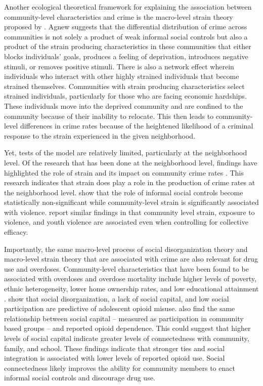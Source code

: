Another ecological theoretical framework for explaining the association between community-level characteristics and crime is the macro-level strain theory proposed by \citeauthor{agnew_general_1999} \citeyear{agnew_general_1999}. Agnew suggests that the differential distribution of crime across communities is not solely a product of weak informal social controls but also a product of the strain producing characteristics in these communities that either blocks individuals’ goals, produces a feeling of deprivation, introduces negative stimuli, or removes positive stimuli. There is also a network effect wherein individuals who interact with other highly strained individuals that become strained themselves. Communities with strain producing characteristics select strained individuals, particularly for those who are facing economic hardships. These individuals move into the deprived community and are confined to the community because of their inability to relocate. This then leads to community-level differences in crime rates because of the heightened likelihood of a criminal response to the strain experienced in the given neighborhood.

Yet, tests of the \textcite{agnew_general_1999} model are relatively limited, particularly at the neighborhood level. Of the research that has been done at the neighborhood level, findings have highlighted the role of strain and its impact on community crime rates \parencite{antunes_social_2022, warner_strain_2003}. This research indicates that strain does play a role in the production of crime rates at the neighborhood level. \textcite{warner_strain_2003} show that the role of informal social controls become statistically non-significant while community-level strain is significantly associated with violence. \textcite{antunes_social_2022} report similar findings in that community level strain, exposure to violence, and youth violence are associated even when controlling for collective efficacy. 

Importantly, the same macro-level process of social disorganization theory and macro-level strain theory that are associated with crime are also relevant for drug use and overdoses. Community-level characteristics that have been found to be associated with overdoses and overdose mortality include higher levels of poverty, ethnic heterogeneity, lower home ownership rates, and low educational attainment \parencite{chichester_pharmacies_2020, galea_income_2003, hannon_neighborhood_2006, ford_neighborhood_2017}. \textcite{ford_neighborhood_2017} show that social disorganization, a lack of social capital, and low social participation are predictive of adolescent opioid misuse. \textcite{winstanley_association_2008} also find the same relationship between social capital -- measured as participation in community based groups -- and reported opioid dependence. This could suggest that higher levels of social capital indicate greater levels of connectedness with community, family, and school. These findings indicate that stronger ties and social integration is associated with lower levels of reported opioid use. Social connectedness likely improves the ability for community members to enact informal social controls and discourage drug use. 

